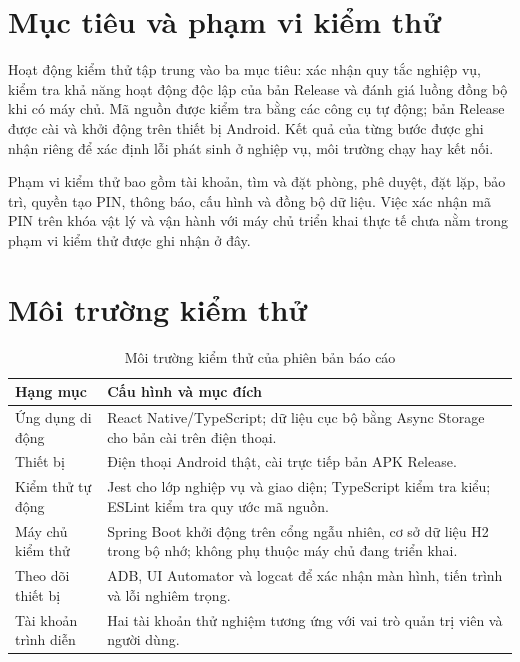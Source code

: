 \section{Mục tiêu và phạm vi kiểm thử}

Hoạt động kiểm thử tập trung vào ba mục tiêu: xác nhận quy tắc nghiệp vụ, kiểm tra khả năng hoạt động độc lập của bản Release và đánh giá luồng đồng bộ khi có máy chủ. Mã nguồn được kiểm tra bằng các công cụ tự động; bản Release được cài và khởi động trên thiết bị Android. Kết quả của từng bước được ghi nhận riêng để xác định lỗi phát sinh ở nghiệp vụ, môi trường chạy hay kết nối.

Phạm vi kiểm thử bao gồm tài khoản, tìm và đặt phòng, phê duyệt, đặt lặp, bảo trì, quyền tạo PIN, thông báo, cấu hình và đồng bộ dữ liệu. Việc xác nhận mã PIN trên khóa vật lý và vận hành với máy chủ triển khai thực tế chưa nằm trong phạm vi kiểm thử được ghi nhận ở đây.

\section{Môi trường kiểm thử}

\begin{table}[H]
\centering
\caption{Môi trường kiểm thử của phiên bản báo cáo}
\label{tab:env}
\small
\begin{tabularx}{\textwidth}{>{\raggedright\arraybackslash}p{3.5cm}>{\raggedright\arraybackslash}X}
\toprule
\rowcolor{RoomHubLight}
\textbf{Hạng mục} & \textbf{Cấu hình và mục đích} \\
\midrule
Ứng dụng di động & React Native/TypeScript; dữ liệu cục bộ bằng Async Storage cho bản cài trên điện thoại. \\
Thiết bị & Điện thoại Android thật, cài trực tiếp bản APK Release. \\
Kiểm thử tự động & Jest cho lớp nghiệp vụ và giao diện; TypeScript kiểm tra kiểu; ESLint kiểm tra quy ước mã nguồn. \\
Máy chủ kiểm thử & Spring Boot khởi động trên cổng ngẫu nhiên, cơ sở dữ liệu H2 trong bộ nhớ; không phụ thuộc máy chủ đang triển khai. \\
Theo dõi thiết bị & ADB, UI Automator và logcat để xác nhận màn hình, tiến trình và lỗi nghiêm trọng. \\
Tài khoản trình diễn & Hai tài khoản thử nghiệm tương ứng với vai trò quản trị viên và người dùng. \\
\bottomrule
\end{tabularx}
\end{table}

